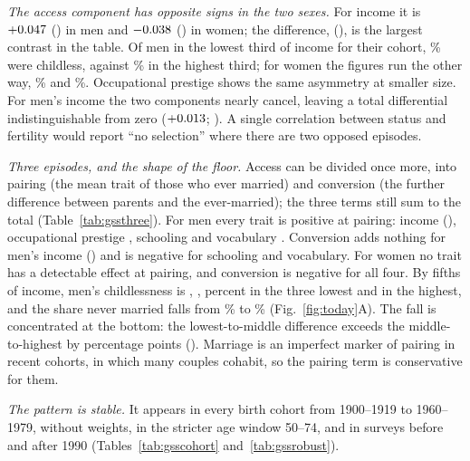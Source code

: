 \emph{The access component has opposite signs in the two sexes.} For income it is $+0.047$ (\GssIncMAccCI) in men and
$-0.038$ (\GssIncWAccCI) in women; the difference, \GssIncDiffAcc{} (\GssIncDiffAccCI), is the largest contrast in the
table. Of men in the lowest third of income for their cohort, \GssChlMIncLo\% were childless, against \GssChlMIncHi\% in the
highest third; for women the figures run the other way, \GssChlWIncLo\% and \GssChlWIncHi\%. Occupational
prestige shows the same asymmetry at smaller size. For men's income the two components nearly cancel, leaving a total
differential indistinguishable from zero ($+0.013$; \GssIncMTotCI). A single correlation between status and fertility
would report ``no selection'' where there are two opposed episodes.

\emph{Three episodes, and the shape of the floor.} Access can be divided once more, into pairing (the mean trait of those who
ever married) and conversion (the further difference between parents and the ever-married); the three terms still sum to the
total (Table~\ref{tab:gssthree}). For men every trait is positive at pairing: income \GssIncMPair{} (\GssIncMPairCI), occupational
prestige \GssPreMPair, schooling \GssSchMPair{} and vocabulary \GssVocMPair. Conversion adds nothing for men's income
(\GssIncMConv) and is negative for schooling and vocabulary. For women no trait has a detectable effect at pairing, and
conversion is negative for all four. By fifths of income, men's childlessness is \GssQfMOne, \GssQfMTwo, \GssQfMThree{} percent in
the three lowest and \GssQfMFive{} in the highest, and the share never married falls from \GssNmMOne\% to \GssNmMFive\%
(Fig.~\ref{fig:today}A). The fall is concentrated at the bottom: the lowest-to-middle difference exceeds the middle-to-highest by
\GssFloorM{} percentage points (\GssFloorMCI). Marriage is an imperfect marker of pairing in recent cohorts, in which many
couples cohabit, so the pairing term is conservative for them.

\emph{The pattern is stable.} It appears in every birth cohort from 1900--1919 to 1960--1979, without weights, in the stricter
age window 50--74, and in surveys before and after 1990 (Tables~\ref{tab:gsscohort} and~\ref{tab:gssrobust}).

